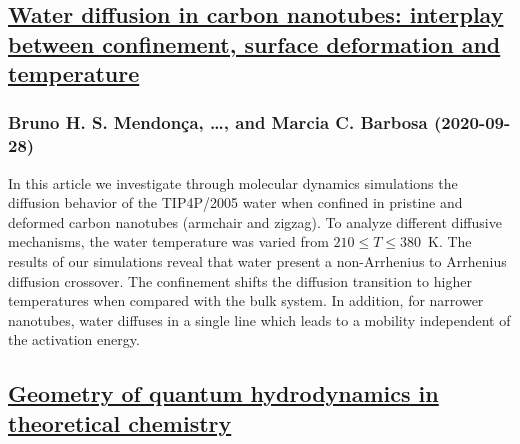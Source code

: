 \subsection*{\href{http://arxiv.org/abs/2009.13611v1}{Water diffusion in carbon nanotubes: interplay between confinement,  surface deformation and temperature}}
\subsubsection*{Bruno H. S. Mendonça, \dots, and Marcia C. Barbosa (2020-09-28)}
In this article we investigate through molecular dynamics simulations the
diffusion behavior of the TIP4P/2005 water when confined in pristine and
deformed carbon nanotubes (armchair and zigzag). To analyze different diffusive
mechanisms, the water temperature was varied from $210\leq T\leq 380$~K. The
results of our simulations reveal that water present a non-Arrhenius to
Arrhenius diffusion crossover. The confinement shifts the diffusion transition
to higher temperatures when compared with the bulk system. In addition, for
narrower nanotubes, water diffuses in a single line which leads to a mobility
independent of the activation energy.

\subsection*{\href{http://arxiv.org/abs/2009.13601v1}{Geometry of quantum hydrodynamics in theoretical chemistry}}
